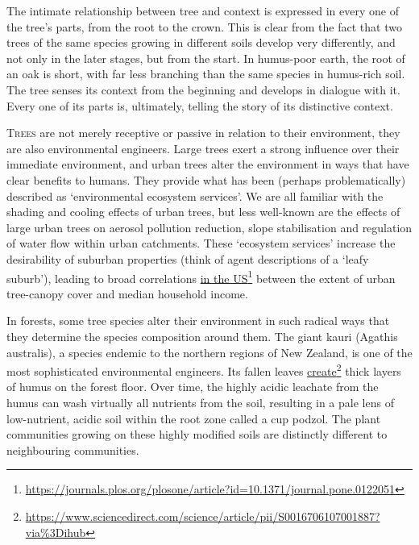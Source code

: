 \documentclass[../main.tex]{subfiles}
\begin{document}
\begin{multicols}{2}
{The intimate relationship between tree and context is expressed in every one of the tree’s parts, from the root to the crown. This is clear from the fact that two trees of the same species growing in different soils develop very differently, and not only in the later stages, but from the start. In humus-poor earth, the root of an oak is short, with far less branching than the same species in humus-rich soil. The tree senses its context from the beginning and develops in dialogue with it. Every one of its parts is, ultimately, telling the story of its distinctive context. 

\lettrine{T}{rees} are not merely receptive or passive in relation to their environment, they are also environmental engineers. Large trees exert a strong influence over their immediate environment, and urban trees alter the environment in ways that have clear benefits to humans. They provide what has been (perhaps problematically) described as ‘environmental ecosystem services’. We are all familiar with the shading and cooling effects of urban trees, but less well-known are the effects of large urban trees on aerosol pollution reduction, slope stabilisation and regulation of water flow within urban catchments. These ‘ecosystem services’ increase the desirability of suburban properties (think of agent descriptions of a ‘leafy suburb’), leading to broad correlations \href{https://journals.plos.org/plosone/article?id=10.1371/journal.pone.0122051}{in the US}\footnote{\url{https://journals.plos.org/plosone/article?id=10.1371/journal.pone.0122051}} between the extent of urban tree-canopy cover and median household income. 

In forests, some tree species alter their environment in such radical ways that they determine the species composition around them. The giant kauri (Agathis australis), a species endemic to the northern regions of New Zealand, is one of the most sophisticated environmental engineers. Its fallen leaves \href{https://www.sciencedirect.com/science/article/pii/S0016706107001887?via\%3Dihub}{create}\footnote{\url{https://www.sciencedirect.com/science/article/pii/S0016706107001887?via\%3Dihub}} thick layers of humus on the forest floor. Over time, the highly acidic leachate from the humus can wash virtually all nutrients from the soil, resulting in a pale lens of low-nutrient, acidic soil within the root zone called a cup podzol. The plant communities growing on these highly modified soils are distinctly different to neighbouring communities. 

}
\end{multicols}
\end{document}
